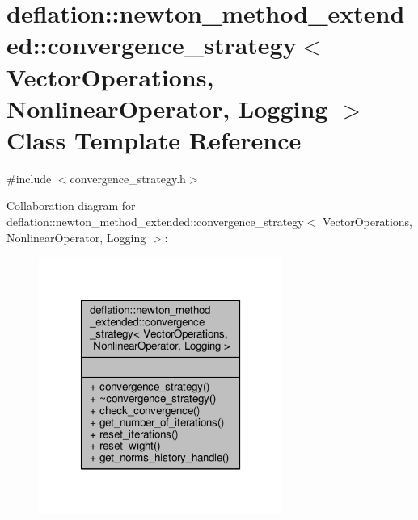 \hypertarget{classdeflation_1_1newton__method__extended_1_1convergence__strategy}{\section{deflation\-:\-:newton\-\_\-method\-\_\-extended\-:\-:convergence\-\_\-strategy$<$ Vector\-Operations, Nonlinear\-Operator, Logging $>$ Class Template Reference}
\label{classdeflation_1_1newton__method__extended_1_1convergence__strategy}
}


{\ttfamily \#include $<$convergence\-\_\-strategy.\-h$>$}



Collaboration diagram for deflation\-:\-:newton\-\_\-method\-\_\-extended\-:\-:convergence\-\_\-strategy$<$ Vector\-Operations, Nonlinear\-Operator, Logging $>$\-:
\nopagebreak
\begin{figure}[H]
\begin{center}
\leavevmode
\includegraphics[width=226pt]{classdeflation_1_1newton__method__extended_1_1convergence__strategy__coll__graph}
\end{center}
\end{figure}
